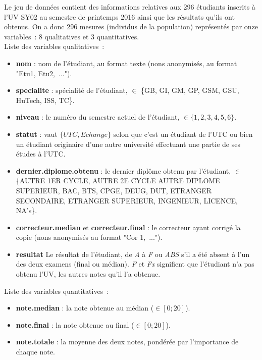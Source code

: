 \documentclass[a4paper,12pt]{report}
\begin{document}
Le jeu de données contient des informations relatives aux 296 étudiants inscrits à l’UV SY02 au semestre de printemps 2016 ainsi que les résultats qu'ils ont obtenus. On a donc 296 mesures (individus de la population) représentés par onze variables~: 8 qualitatives et 3 quantitatives.\\
Liste des variables qualitatives~:
\begin{itemize}
	\item \textbf{nom} : nom de l'étudiant, au format texte (nons anonymisés, au format "Etu1, Etu2,~...").
	\item \textbf{specialite} : spécialité de l'étudiant, $\in$ \{GB, GI, GM, GP, GSM, GSU, HuTech, ISS, TC\}.
	\item \textbf{niveau} : le numéro du semestre actuel de l'étudiant, $ \in \{1,2,3,4,5,6\} $.
	\item \textbf{statut} : vaut $ \{UTC,Echange\} $ selon que c'est un étudiant de l'UTC ou bien un étudiant originaire d'une autre université effectuant une partie de ses études à l'UTC.
	\item \textbf{dernier.diplome.obtenu} : le dernier diplôme obtenu par l'étudiant, $\in$ \{AUTRE 1ER CYCLE, AUTRE 2E CYCLE AUTRE DIPLOME SUPERIEUR, BAC, BTS, CPGE, DEUG, DUT, ETRANGER SECONDAIRE, ETRANGER SUPERIEUR, INGENIEUR, LICENCE, NA's\}.
	\item \textbf{correcteur.median} et \textbf{correcteur.final} : le correcteur ayant corrigé la copie (nons anonymisés au format "Cor 1,~...").
	\item \textbf{resultat} Le résultat de l'étudiant, de \textit{A} à \textit{F} ou \textit{ABS} s'il a été absent à l'un des deux examens (final ou médian). \textit{F} et \textit{Fx} signifient que l'étudiant n'a pas obtenu l'UV, les autres notes qu'il l'a obtenue.
\end{itemize}
Liste des variables quantitatives~:
\begin{itemize}
	\item \textbf{note.median} : la note obtenue au médian ($ \in [0;20] $).
	\item \textbf{note.final} : la note obtenue au final ($ \in [0;20] $).
	\item \textbf{note.totale} : la moyenne des deux notes, pondérée par l'importance de chaque note.
\end{itemize}
\end{document}
